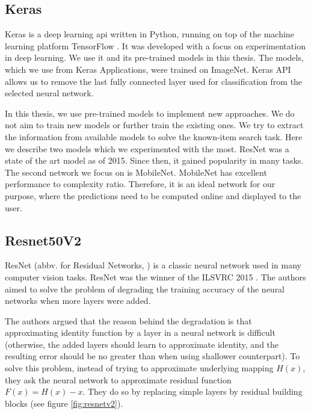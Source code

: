 \subsection{Keras}

Keras \citep{chollet2015keras} is a deep learning \acrshort{api} written in Python, running on top of the machine learning platform TensorFlow \citep{tensorflow2015-whitepaper}. It was developed with a focus on experimentation in deep learning. We use it and its pre-trained models in this thesis. The models, which we use from Keras Applications, were trained on ImageNet. Keras API allows us to remove the last fully connected layer used for classification from the selected neural network.

In this thesis, we use pre-trained models to implement new approaches. We do not aim to train new models or further train the existing ones. We try to extract the information from available models to solve the known-item search task. Here we describe two models which we experimented with the most. ResNet was a state of the art model as of 2015. Since then, it gained popularity in many tasks. The second network we focus on is MobileNet. MobileNet has excellent performance to complexity ratio. Therefore, it is an ideal network for our purpose, where the predictions need to be computed online and displayed to the user.

\subsection*{Resnet50V2}

ResNet (abbv. for Residual Networks, \cite{resnet}) is a classic neural network used in many computer vision tasks. ResNet was the winner of the ILSVRC 2015 \citep{ILSVRC15}. The authors aimed to solve the problem of degrading the training accuracy of the neural networks when more layers were added. 

The authors argued that the reason behind the degradation is that approximating identity function by a layer in a neural network is difficult (otherwise, the added layers should learn to approximate identity, and the resulting error should be no greater than when using shallower counterpart). To solve this problem, instead of trying to approximate underlying mapping $H(x)$, they ask the neural network to approximate residual function $F(x)=H(x) - x$. They do so by replacing simple layers by residual building blocks (see figure \ref{fig:resnetv2}).

